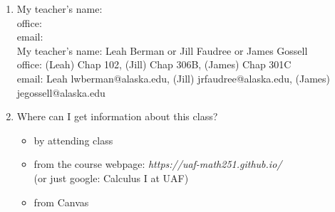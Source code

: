 \documentclass[11pt,fleqn]{article}
\begin{document}
\renewcommand{\headrulewidth}{0pt}
\newcommand{\blank}[1]{\rule{#1}{0.75pt}}
\renewcommand{\d}{\displaystyle}
\vspace*{-0.7in}
\begin{center}
  \large {}
\end{center}


\begin{enumerate}
\item My teacher's name: \underline{\hspace{2in}}\\ 

office:  \underline{\hspace{2in}}\\ 

email:  \underline{\hspace{2in}}\\

My teacher's name: { Leah Berman or Jill Faudree or James Gossell}\\ office:  (Leah) Chap 102, {(Jill) Chap 306B, (James) Chap 301C}\\ email: {Leah lwberman@alaska.edu, (Jill) jrfaudree@alaska.edu, (James) jegossell@alaska.edu}\\

\item Where can I get information about this class?
\begin{itemize}
\item by attending class
\item from the course webpage: \textit{https://uaf-math251.github.io/} \\(or just google: Calculus I at UAF)
\item from Canvas
\end{itemize}


\end{enumerate}
\end{document}
